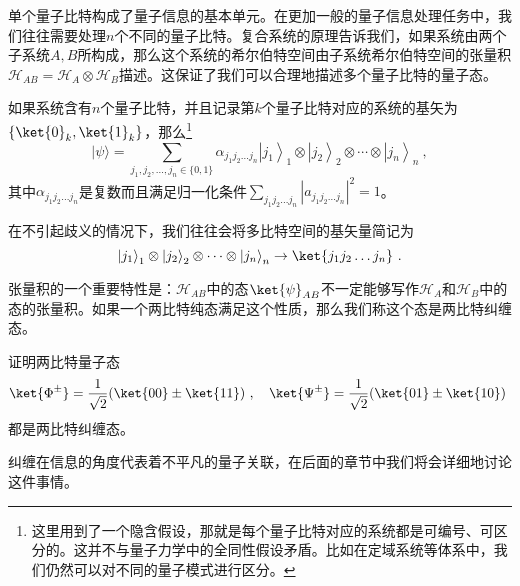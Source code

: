 
单个量子比特构成了量子信息的基本单元。在更加一般的量子信息处理任务中，我们往往需要处理$n$个不同的量子比特。复合系统的原理告诉我们，如果系统由两个子系统$A,B$所构成，那么这个系统的希尔伯特空间由子系统希尔伯特空间的张量积$\mathcal{H}_{AB}=\mathcal{H}_A\otimes\mathcal{H}_B$描述。这保证了我们可以合理地描述多个量子比特的量子态。

如果系统含有$n$个量子比特，并且记录第$k$个量子比特对应的系统的基矢为$\{\ket{0}_k,\ket{1}_k\}$，那么\footnote{这里用到了一个隐含假设，那就是每个量子比特对应的系统都是可编号、可区分的。这并不与量子力学中的全同性假设矛盾。比如在定域系统等体系中，我们仍然可以对不同的量子模式进行区分。}$$
|\psi\rangle=\sum_{j_1, j_2, \ldots, j_n \in\{0,1\}} \alpha_{j_1 j_2 \ldots j_n}\left|j_1\right\rangle_1 \otimes\left|j_2\right\rangle_2 \otimes \cdots \otimes\left|j_n\right\rangle_n~,
$$其中$\alpha_{j_1j_2\ldots j_n}$是复数而且满足归一化条件$\sum_{j_1j_2\ldots j_n}|a_{j_1j_2\ldots j_n}|^2=1$。

在不引起歧义的情况下，我们往往会将多比特空间的基矢量简记为$$\left|j_1\right\rangle_1 \otimes\left|j_2\right\rangle_2 \otimes \cdots \otimes\left|j_n\right\rangle_n\to \ket{j_1j_2\ldots j_n}~. $$

张量积的一个重要特性是：$\mathcal{H}_{AB}$中的态$\ket{\psi}_{AB}$不一定能够写作$\mathcal{H}_A$和$\mathcal{H}_B$中的态的张量积。如果一个两比特纯态满足这个性质，那么我们称这个态是两比特纠缠态。
\begin{exercise}{}
证明两比特量子态$$\ket{\Phi^{\pm}}=\frac{1}{\sqrt{2}}(\ket{00}\pm\ket{11})~,\quad \ket{\Psi^{\pm}}=\frac{1}{\sqrt{2}}(\ket{01}\pm\ket{10})~$$
都是两比特纠缠态。
\end{exercise}

纠缠在信息的角度代表着不平凡的量子关联，在后面的章节中我们将会详细地讨论这件事情。